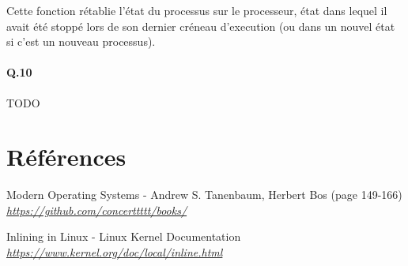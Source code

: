 \documentclass[10pt]{article}
\begin{document}
 Cette fonction rétablie l'état du processus sur le processeur, état dans lequel il avait été stoppé lors de son dernier créneau d'execution (ou dans un nouvel état si c'est un nouveau processus).
 
 
 
 
 \paragraph{Q.10} TODO

    \newpage
    \section{Références}
    \begin{thebibliography}{}

        \label{modernos}
        Modern Operating Systems - Andrew S. Tanenbaum, Herbert Bos (page 149-166)\newline
        \href{https://github.com/concerttttt/books/blob/master/Modern Operating Systems 4th Edition--Andrew Tanenbaum.pdf}
        {\textit{https://github.com/concerttttt/books/}}\newline
	
        \label{inlinefunc}
        Inlining in Linux - Linux Kernel Documentation\newline
        \href{https://www.kernel.org/doc/local/inline.html}
        {\textit{https://www.kernel.org/doc/local/inline.html}}\newline
        
    \end{thebibliography}
    
\end{document}
